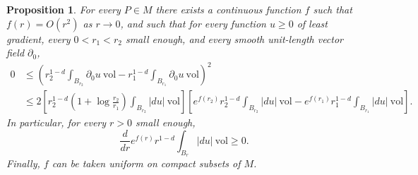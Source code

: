 \documentclass[reqno,12pt,letterpaper]{amsart}
\newcommand{\vol}{\mathrm{vol}}
\newtheorem{proposition}[theorem]{Proposition}
\theoremstyle{definition}
\numberwithin{equation}{section}
\begin{document}
\begin{proposition}\label{Monotonicity Formula}
For every $P \in M$ there exists a continuous function $f$ such that $f(r) = O(r^2)$ as $r \to 0$, and such that for every function $u \geq 0$ of least gradient, every $0 < r_1 < r_2$ small enough, and every smooth unit-length vector field $\partial_0$,
\begin{align*}
0
&\leq \left(r_2^{1 - d} \int_{B_{r_2}} \partial_0u ~\vol - r_1^{1 - d} \int_{B_{r_1}} \partial_0u ~\vol \right)^2\\
&\leq 2\left[r_2^{1 - d}\left(1 + \log \frac{r_2}{r_1}\right) \int_{B_{r_2}} |du| ~\vol\right] \left[e^{f(r_2)} r_2^{1 - d}\int_{B_{r_2}} |du| ~\vol - e^{f(r_1)} r_1^{1 - d} \int_{B_{r_1}} |du| ~\vol \right].
\end{align*}
In particular, for every $r > 0$ small enough,
\begin{equation}\label{TrueMonotonicity}
\frac{d}{dr} e^{f(r)} r^{1 - d} \int_{B_r} |du| ~\vol \geq 0.
\end{equation}
Finally, $f$ can be taken uniform on compact subsets of $M$.
\end{proposition}
\end{document}
